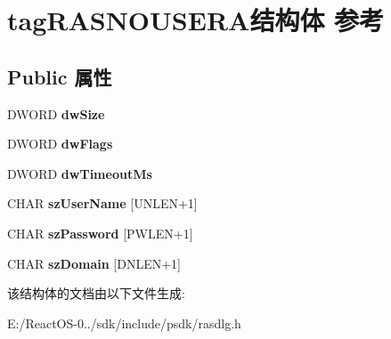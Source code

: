 \hypertarget{structtag_r_a_s_n_o_u_s_e_r_a}{}\section{tag\+R\+A\+S\+N\+O\+U\+S\+E\+R\+A结构体 参考}
\label{structtag_r_a_s_n_o_u_s_e_r_a}
\subsection*{Public 属性}
\begin{DoxyCompactItemize}
\item 
\mbox{\label{structtag_r_a_s_n_o_u_s_e_r_a_a02e9a25ea77c1d2127fd9ea3e1caad8f}} 
D\+W\+O\+RD {\bfseries dw\+Size}
\item 
\mbox{\label{structtag_r_a_s_n_o_u_s_e_r_a_ab7def38c5b393c9e3e4e52db6889d441}} 
D\+W\+O\+RD {\bfseries dw\+Flags}
\item 
\mbox{\label{structtag_r_a_s_n_o_u_s_e_r_a_a5c96597bf9b3c738d375864c3a799096}} 
D\+W\+O\+RD {\bfseries dw\+Timeout\+Ms}
\item 
\mbox{\label{structtag_r_a_s_n_o_u_s_e_r_a_a253d4f521e711c324456b325afac7289}} 
C\+H\+AR {\bfseries sz\+User\+Name} \mbox{[}U\+N\+L\+EN+1\mbox{]}
\item 
\mbox{\label{structtag_r_a_s_n_o_u_s_e_r_a_a6506ac63130c4a8ef7a73935625ccbad}} 
C\+H\+AR {\bfseries sz\+Password} \mbox{[}P\+W\+L\+EN+1\mbox{]}
\item 
\mbox{\label{structtag_r_a_s_n_o_u_s_e_r_a_a75f41a0e8ad2038d96cbfa581b978e83}} 
C\+H\+AR {\bfseries sz\+Domain} \mbox{[}D\+N\+L\+EN+1\mbox{]}
\end{DoxyCompactItemize}


该结构体的文档由以下文件生成\+:\begin{DoxyCompactItemize}
\item 
E\+:/\+React\+O\+S-\/0../sdk/include/psdk/rasdlg.\+h\end{DoxyCompactItemize}
